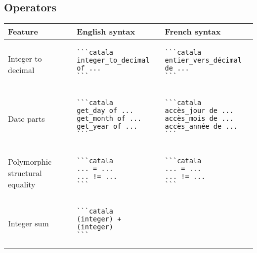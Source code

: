 \documentclass[a3paper,landscape]{article}
\begin{document}
\begin{multicols*}{2}
\section*{Operators}
\begin{center}
\begin{tabular}{p{}p{}p{}}
\toprule
Feature&English syntax&French syntax\\\midrule
Integer to decimal&
\vspace*{-1.75em}
\begin{verbatim}
```catala
integer_to_decimal of ...
```
\end{verbatim}
\vspace*{-1.75em}
&
\vspace*{-1.75em}
\begin{verbatim}
```catala
entier_vers_décimal de ...
```
\end{verbatim}
\vspace*{-1.75em}
\\
Date parts&
\vspace*{-1.75em}
\begin{verbatim}
```catala
get_day of ...
get_month of ...
get_year of ...
```
\end{verbatim}
\vspace*{-1.75em}
&
\vspace*{-1.75em}
\begin{verbatim}
```catala
accès_jour de ...
accès_mois de ...
accès_année de ...
```
\end{verbatim}
\vspace*{-1.75em}
\\
Polymorphic structural equality&
\vspace*{-1.75em}
\begin{verbatim}
```catala
... = ...
... != ...
```
\end{verbatim}
\vspace*{-1.75em}
&
\vspace*{-1.75em}
\begin{verbatim}
```catala
... = ...
... != ...
```
\end{verbatim}
\vspace*{-1.75em}
\\
Integer sum&
\vspace*{-1.75em}
\begin{verbatim}
```catala
(integer) + (integer)
```
\end{verbatim}
\vspace*{-1.75em}

\end{tabular}
\end{center}
\end{multicols*}
\end{document}
